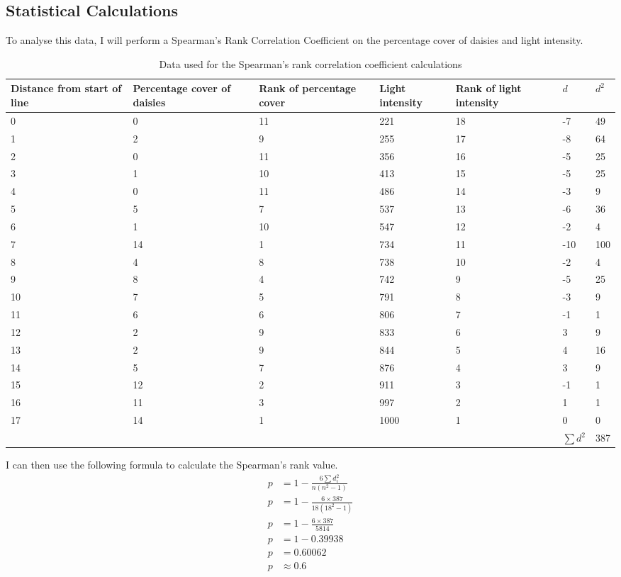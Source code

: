\documentclass{thomasClass}
\begin{document}
\subsection{Statistical Calculations}
To analyse this data, I will perform a Spearman's Rank Correlation Coefficient on the percentage cover of daisies and light intensity.
\begin{table}[H]
\centering
\begin{tabularx}{0.8\textwidth}{X|XXXXXX}
Distance from start of line & Percentage cover of daisies & Rank of percentage cover & Light intensity & Rank of light intensity & $d$  & $d^2$ \\
\hline
0 & 0 & 11 & 221 & 18 & -7 & 49 \\
1 & 2 & 9 & 255 & 17 & -8 & 64 \\
2 & 0 & 11 & 356 & 16 & -5 & 25 \\
3 & 1 & 10 & 413 & 15 & -5 & 25 \\
4 & 0 & 11 & 486 & 14 & -3 & 9 \\
5 & 5 & 7 & 537 & 13 & -6 & 36 \\
6 & 1 & 10 & 547 & 12 & -2 & 4 \\
7 & 14 & 1 & 734 & 11 & -10 & 100 \\
8 & 4 & 8 & 738 & 10 & -2 & 4 \\
9 & 8 & 4 & 742 & 9 & -5 & 25 \\
10 & 7 & 5 & 791 & 8 & -3 & 9 \\
11 & 6 & 6 & 806 & 7 & -1 & 1 \\
12 & 2 & 9 & 833 & 6 & 3 & 9 \\
13 & 2 & 9 & 844 & 5 & 4 & 16 \\
14 & 5 & 7 & 876 & 4 & 3 & 9 \\
15 & 12 & 2 & 911 & 3 & -1 & 1 \\
16 & 11 & 3 & 997 & 2 & 1 & 1 \\
17 & 14 & 1 & 1000 & 1 & 0 & 0 \\
\cline{6-7}
 &  &  &  &  & $\sum d^2$ & 387
\end{tabularx}
\caption{Data used for the Spearman's rank correlation coefficient calculations}
\end{table}
\noindent I can then use the following formula to calculate the Spearman's  rank value.
\begin{align*}
    p &= 1 - \frac{6\sum d_{i}^{2}}{n(n^{2} - 1)}\\
    p &= 1 - \frac{6 \times 387}{18(18^{2} - 1)}\\
    p &= 1 - \frac{6 \times 387}{5814}\\
    p &= 1 - 0.39938\\
    p &= 0.60062\\
    p & \approx 0.6
\end{align*}
\end{document}
